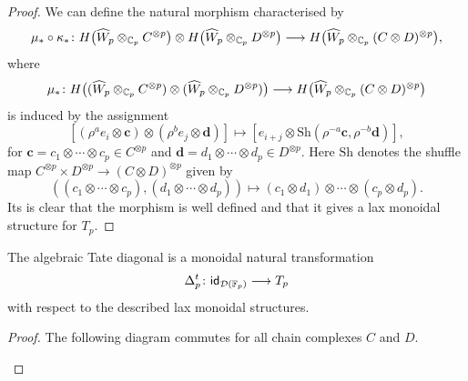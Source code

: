 \begin{proof}
	We can define the natural morphism characterised by
	\[
	\mu_* \circ \kappa_* \colon H\big(\widehat W_p \otimes_{\mathbb{C}_p} C^{\otimes p}\big) \otimes H\big(\widehat W_p \otimes_{\mathbb{C}_p} D^{\otimes p}\big) \longrightarrow H\big(\widehat W_p \otimes_{\mathbb{C}_p} (C \otimes D)^{\otimes p}\big),
	\]
	where
	\[
	\mu_* \colon H\big((\widehat W_p \otimes_{\mathbb{C}_p} C^{\otimes p}) \otimes (\widehat W_p \otimes_{\mathbb{C}_p} D^{\otimes p})\big) \longrightarrow H\big(\widehat W_p \otimes_{\mathbb{C}_p} (C \otimes D)^{\otimes p}\big)
	\]
	is induced by the assignment
	\[
	[(\rho^a e_i \otimes \mathbf{c}) \otimes (\rho^b e_j \otimes \mathbf{d})] \longmapsto [e_{i+j} \otimes \mathrm{Sh}(\rho^{-a}\mathbf{c},\rho^{-b}\mathbf{d})],
	\]
	for \(\mathbf{c} = c_1 \otimes \cdots \otimes c_p \in C^{\otimes p}\) and \(\mathbf{d} = d_1 \otimes \cdots \otimes d_p \in D^{\otimes p}\).
	Here \(\mathrm{Sh}\) denotes the shuffle map \(C^{\otimes p} \times D^{\otimes p} \to (C \otimes D)^{\otimes p}\) given by
	\[
	((c_1 \otimes \cdots \otimes c_p),(d_1 \otimes \cdots \otimes d_p)) \longmapsto (c_1 \otimes d_1) \otimes \cdots \otimes (c_p \otimes d_p).
	\]
	Its is clear that the morphism is well defined and that it gives a lax monoidal structure for \(T_p\).
\end{proof}

\begin{lemma}
	The algebraic Tate diagonal is a monoidal natural transformation
	\[
	\Delta^t_p \colon \mathsf{id}_{\mathcal{D}({\mathbb{F}_p})} \longrightarrow T_p
	\]
	with respect to the described lax monoidal structures.
\end{lemma}

\begin{proof}
	The following diagram commutes for all chain complexes \(C\) and \(D\).

	\begin{center}
	\end{center}
\end{proof}
